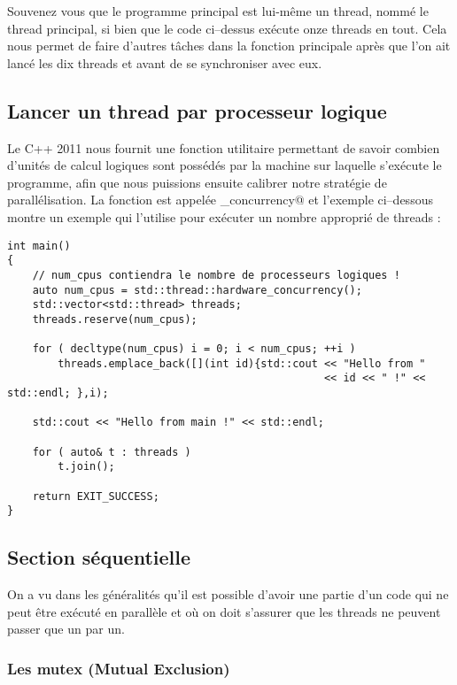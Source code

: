 \documentclass[fleqn,11pt]{article}
\begin{document}
Souvenez vous que le programme principal est lui-même un thread, nommé le thread principal, si bien que le code
ci--dessus exécute onze threads en tout. Cela nous permet de faire d'autres tâches dans la fonction principale
après que l'on ait lancé les dix threads et avant de se synchroniser avec eux. 


\subsection{Lancer un thread par processeur logique}

Le C++ 2011 nous fournit une fonction utilitaire permettant de savoir combien d'unités de calcul
logiques sont possédés par la machine sur laquelle s'exécute le programme, afin que nous puissions ensuite
calibrer notre stratégie de parallélisation. La fonction est appelée \lstinline@hardware_concurrency@
et l'exemple ci--dessous montre un exemple qui l'utilise pour exécuter un nombre approprié de threads :

\begin{lstlisting}
int main()
{
    // num_cpus contiendra le nombre de processeurs logiques !
    auto num_cpus = std::thread::hardware_concurrency();
    std::vector<std::thread> threads;
    threads.reserve(num_cpus);

    for ( decltype(num_cpus) i = 0; i < num_cpus; ++i )
        threads.emplace_back([](int id){std::cout << "Hello from " 
                                                  << id << " !" << std::endl; },i);

    std::cout << "Hello from main !" << std::endl;

    for ( auto& t : threads )
        t.join();

    return EXIT_SUCCESS;
}
\end{lstlisting}

\subsection{Section séquentielle}

On a vu dans les généralités qu'il est possible d'avoir une partie d'un code qui ne peut être exécuté en parallèle et où on doit s'assurer que les threads ne peuvent passer que un par un.

\subsubsection{Les mutex (Mutual Exclusion)}
\end{document}
